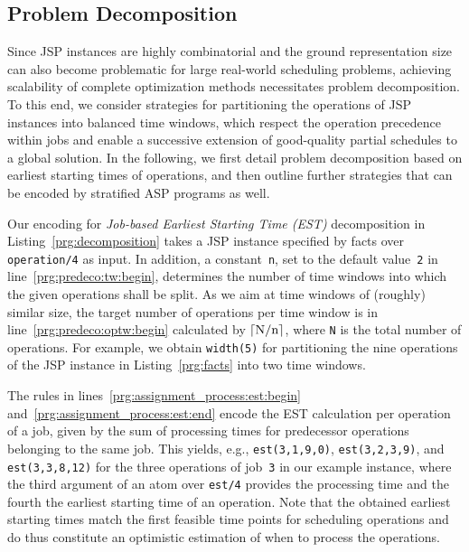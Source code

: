 \documentclass{tlp} %
\begin{document}
\subsection{Problem Decomposition}\label{subsec:decomposition}
%
Since JSP instances are highly combinatorial and the ground representation size
can also become problematic for large real-world scheduling problems, achieving
scalability of complete optimization methods necessitates problem decomposition.
To this end, we consider strategies for partitioning the operations of JSP instances
into balanced time windows, which respect the operation precedence within jobs and
enable a successive extension of good-quality partial schedules to a global solution.
In the following, we first detail problem decomposition based on earliest starting
times of operations, and then outline further strategies that can be encoded
by stratified ASP programs as well.


%
Our encoding for \emph{Job-based Earliest Starting Time (EST)} decomposition
in Listing~\ref{prg:decomposition} takes a JSP instance specified by facts over
\lstinline{operation/4} as input.
In addition, a constant~\lstinline{n},
set to the default value~\lstinline{2} in line~\ref{prg:predeco:tw:begin},
determines the number of time windows into which the given operations
shall be split.
As we aim at time windows of (roughly) similar size,
the target number of operations per time window is in line~\ref{prg:predeco:optw:begin}
calculated by $\lceil \text{\lstinline{N}} / \text{\lstinline{n}}\rceil$,
where \lstinline{N} is the total number of operations.
For example, we obtain \lstinline{width(5)} for partitioning the nine operations
of the JSP instance in Listing~\ref{prg:facts} into two time windows.

The rules in lines~\ref{prg:assignment_process:est:begin} and~\ref{prg:assignment_process:est:end}
encode the EST calculation per operation of a job,
given by the sum of processing times for predecessor operations belonging to the same job.
This yields, e.g., 
\lstinline{est(3,1,9,0)},
\lstinline{est(3,2,3,9)}, and
\lstinline{est(3,3,8,12)}
for the three operations of job~\lstinline{3} in our example instance,
where the third argument of an atom over \lstinline{est/4} provides
the processing time and the fourth the earliest starting time of an operation.
Note that the obtained earliest starting times match the first feasible time
points for scheduling operations and do thus constitute an optimistic
estimation of when to process the operations.
\end{document}
